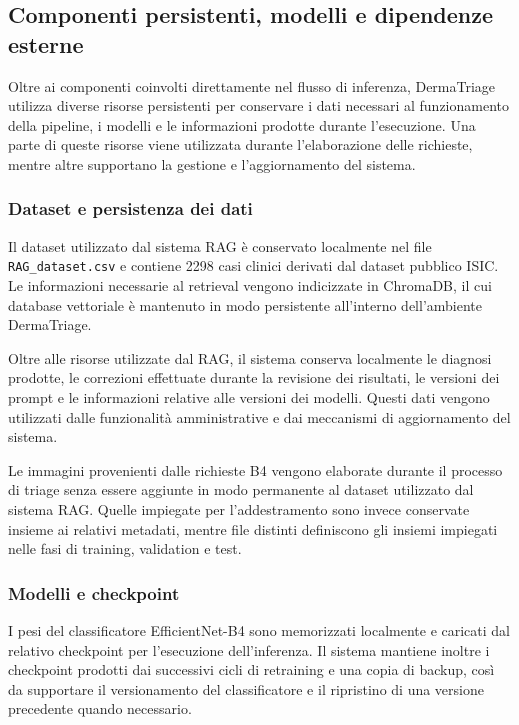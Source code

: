 \subsection{Componenti persistenti, modelli e dipendenze esterne}
Oltre ai componenti coinvolti direttamente nel flusso di inferenza,
DermaTriage utilizza diverse risorse persistenti per conservare i dati
necessari al funzionamento della pipeline, i modelli e le informazioni
prodotte durante l'esecuzione. Una parte di queste risorse viene utilizzata
durante l'elaborazione delle richieste, mentre altre supportano la gestione
e l'aggiornamento del sistema.

\subsubsection{Dataset e persistenza dei dati}
Il dataset utilizzato dal sistema RAG è conservato localmente nel file \texttt{RAG\_dataset.csv} e contiene 2298 casi clinici derivati dal dataset
pubblico ISIC. Le informazioni necessarie al retrieval vengono indicizzate
in ChromaDB, il cui database vettoriale è mantenuto in modo persistente
all'interno dell'ambiente DermaTriage.

Oltre alle risorse utilizzate dal RAG, il sistema conserva localmente le diagnosi prodotte, le correzioni effettuate durante la revisione dei risultati, le versioni dei prompt e le informazioni relative alle versioni dei modelli. Questi dati vengono utilizzati dalle funzionalità amministrative e dai meccanismi di aggiornamento del sistema.

Le immagini provenienti dalle richieste B4 vengono elaborate durante il processo di triage senza essere aggiunte in modo permanente al dataset utilizzato dal sistema RAG. Quelle impiegate per l'addestramento sono invece conservate insieme ai relativi metadati, mentre file distinti definiscono gli insiemi impiegati nelle fasi di training, validation e test.

\subsubsection{Modelli e checkpoint}
I pesi del classificatore EfficientNet-B4 sono memorizzati localmente e caricati dal relativo checkpoint per l'esecuzione dell'inferenza. Il sistema mantiene inoltre i checkpoint prodotti dai successivi cicli di retraining e una copia di backup, così da supportare il versionamento del classificatore e il ripristino di una versione precedente quando necessario.

